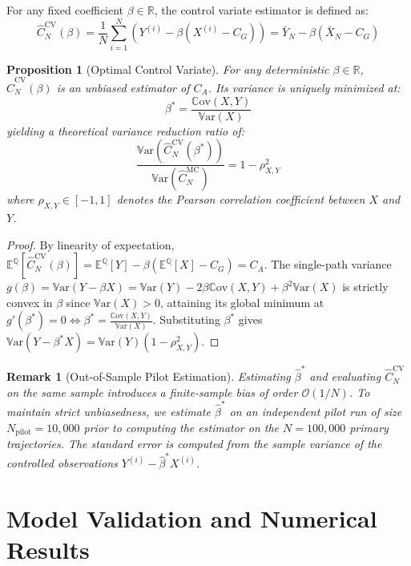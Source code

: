 \documentclass[11pt,a4paper]{article}
\newtheorem{proposition}{Proposition}
\newtheorem{remark}{Remark}
\newcommand{\R}{\mathbb{R}}
\newcommand{\E}{\mathbb{E}}
\newcommand{\Q}{\mathbb{Q}}
\newcommand{\Var}{\mathbb{V}\text{ar}}
\newcommand{\Cov}{\mathbb{C}\text{ov}}
\begin{document}
For any fixed coefficient $\beta \in \R$, the control variate estimator is defined as:
\begin{equation}
    \hat{C}_N^{\text{CV}}(\beta) = \frac{1}{N} \sum_{i=1}^N \left( Y^{(i)} - \beta \left( X^{(i)} - C_G \right) \right) = \bar{Y}_N - \beta \left( \bar{X}_N - C_G \right)
\end{equation}

\begin{proposition}[Optimal Control Variate]
For any deterministic $\beta \in \R$, $\hat{C}_N^{\text{CV}}(\beta)$ is an unbiased estimator of $C_A$. Its variance is uniquely minimized at:
\begin{equation}
    \beta^* = \frac{\Cov(X,Y)}{\Var(X)}
\end{equation}
yielding a theoretical variance reduction ratio of:
\begin{equation}
    \frac{\Var\left(\hat{C}_N^{\text{CV}}(\beta^*)\right)}{\Var\left(\hat{C}_N^{\text{MC}}\right)} = 1 - \rho_{X,Y}^2
\end{equation}
where $\rho_{X,Y} \in [-1,1]$ denotes the Pearson correlation coefficient between $X$ and $Y$.
\end{proposition}

\begin{proof}
By linearity of expectation, $\E^\Q[\hat{C}_N^{\text{CV}}(\beta)] = \E^\Q[Y] - \beta(\E^\Q[X] - C_G) = C_A$. The single-path variance $g(\beta) = \Var(Y - \beta X) = \Var(Y) - 2\beta\Cov(X,Y) + \beta^2\Var(X)$ is strictly convex in $\beta$ since $\Var(X) > 0$, attaining its global minimum at $g'(\beta^*) = 0 \iff \beta^* = \frac{\Cov(X,Y)}{\Var(X)}$. Substituting $\beta^*$ gives $\Var(Y - \beta^* X) = \Var(Y)(1 - \rho_{X,Y}^2)$.
\end{proof}

\begin{remark}[Out-of-Sample Pilot Estimation]
Estimating $\hat{\beta}^*$ and evaluating $\hat{C}_N^{\text{CV}}$ on the same sample introduces a finite-sample bias of order $\mathcal{O}(1/N)$. To maintain strict unbiasedness, we estimate $\hat{\beta}^*$ on an independent pilot run of size $N_{\text{pilot}} = 10,000$ prior to computing the estimator on the $N = 100,000$ primary trajectories. The standard error is computed from the sample variance of the controlled observations $Y^{(i)} - \hat{\beta}^* X^{(i)}$.
\end{remark}

\section{Model Validation and Numerical Results}
\end{document}
